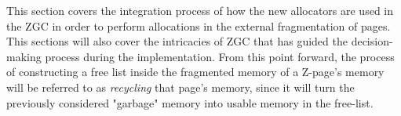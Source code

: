 
This section covers the integration process of how the new allocators are used in the ZGC in order to perform allocations in the external fragmentation of pages. This sections will also cover the intricacies of ZGC that has guided the decision-making process during the implementation. From this point forward, the process of constructing a free list inside the fragmented memory of a Z-page's memory will be referred to as \textit{recycling} that page's memory, since it will turn the previously considered "garbage" memory into usable memory in the free-list.


